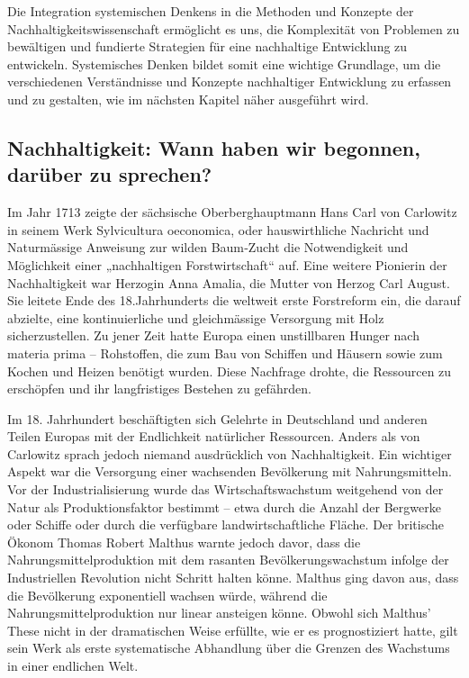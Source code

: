 \documentclass[
  letterpaper,
  DIV=11,
  numbers=noendperiod]{scrartcl}
\begin{document}
Die Integration systemischen Denkens in die Methoden und Konzepte der
Nachhaltigkeitswissenschaft ermöglicht es uns, die Komplexität von
Problemen zu bewältigen und fundierte Strategien für eine nachhaltige
Entwicklung zu entwickeln. Systemisches Denken bildet somit eine
wichtige Grundlage, um die verschiedenen Verständnisse und Konzepte
nachhaltiger Entwicklung zu erfassen und zu gestalten, wie im nächsten
Kapitel näher ausgeführt wird.

\subsection{Nachhaltigkeit: Wann haben wir begonnen, darüber zu
sprechen?}\label{nachhaltigkeit-wann-haben-wir-begonnen-daruxfcber-zu-sprechen}

Im Jahr 1713 zeigte der sächsische Oberberghauptmann Hans Carl von
Carlowitz in seinem Werk Sylvicultura oeconomica, oder hauswirthliche
Nachricht und Naturmässige Anweisung zur wilden Baum‑Zucht die
Notwendigkeit und Möglichkeit einer „nachhaltigen Forstwirtschaft`` auf.
Eine weitere Pionierin der Nachhaltigkeit war Herzogin Anna Amalia, die
Mutter von Herzog Carl August. Sie leitete Ende des 18.Jahrhunderts die
weltweit erste Forstreform ein, die darauf abzielte, eine
kontinuierliche und gleichmässige Versorgung mit Holz sicherzustellen.
Zu jener Zeit hatte Europa einen unstillbaren Hunger nach materia prima
-- Rohstoffen, die zum Bau von Schiffen und Häusern sowie zum Kochen und
Heizen benötigt wurden. Diese Nachfrage drohte, die Ressourcen zu
erschöpfen und ihr langfristiges Bestehen zu gefährden.

Im 18. Jahrhundert beschäftigten sich Gelehrte in Deutschland und
anderen Teilen Europas mit der Endlichkeit natürlicher Ressourcen.
Anders als von Carlowitz sprach jedoch niemand ausdrücklich von
Nachhaltigkeit. Ein wichtiger Aspekt war die Versorgung einer wachsenden
Bevölkerung mit Nahrungsmitteln. Vor der Industrialisierung wurde das
Wirtschaftswachstum weitgehend von der Natur als Produktionsfaktor
bestimmt -- etwa durch die Anzahl der Bergwerke oder Schiffe oder durch
die verfügbare landwirtschaftliche Fläche. Der britische Ökonom Thomas
Robert Malthus warnte jedoch davor, dass die Nahrungsmittelproduktion
mit dem rasanten Bevölkerungswachstum infolge der Industriellen
Revolution nicht Schritt halten könne. Malthus ging davon aus, dass die
Bevölkerung exponentiell wachsen würde, während die
Nahrungsmittelproduktion nur linear ansteigen könne. Obwohl sich
Malthus' These nicht in der dramatischen Weise erfüllte, wie er es
prognostiziert hatte, gilt sein Werk als erste systematische Abhandlung
über die Grenzen des Wachstums in einer endlichen Welt.
\end{document}

